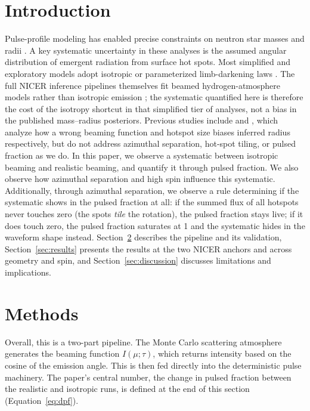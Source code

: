 \documentclass[twocolumn]{aastex701}
\begin{document}


\section{Introduction} \label{sec:intro}
Pulse-profile modeling has enabled precise constraints on neutron star masses and radii
\citep{Bogdanov2019, Riley2019, Miller2019}.
A key systematic uncertainty in these analyses is the assumed angular distribution of
emergent radiation from surface hot spots. Most simplified and exploratory models adopt
isotropic or parameterized limb-darkening laws
\citep[e.g.][]{AnnalaPoutanen2010,Psaltis2014,Sotani2018}.
The full NICER inference pipelines themselves fit beamed hydrogen-atmosphere models rather
than isotropic emission \citep{Bogdanov2019,Riley2019,Miller2019}; the systematic quantified
here is therefore the cost of the isotropy shortcut in that simplified tier of analyses, not
a bias in the published mass--radius posteriors.
Previous studies include \citet{Zhao2024a, Zhao2024b} and \citet{Baubock2015}, which analyze
how a wrong beaming function and hotspot size biases inferred radius respectively, but do
not address azimuthal separation, hot-spot tiling, or pulsed fraction as we do.
In this paper, we observe a systematic between isotropic beaming and realistic beaming, and
quantify it through pulsed fraction. We also observe how azimuthal separation and high spin
influence this systematic.
Additionally, through azimuthal separation, we observe a rule determining if the systematic
shows in the pulsed fraction at all: if the summed flux of all hotspots never touches zero
(the spots \emph{tile} the rotation), the pulsed fraction stays live; if it does touch zero,
the pulsed fraction saturates at 1 and the systematic hides in the waveform shape instead.
Section~\ref{sec:methods} describes the pipeline and its validation,
Section~\ref{sec:results} presents the results at the two NICER anchors and across geometry
and spin, and Section~\ref{sec:discussion} discusses limitations and implications.

\section{Methods} \label{sec:methods}
Overall, this is a two-part pipeline. The Monte Carlo scattering atmosphere generates the
beaming function $I(\mu;\tau)$, which returns intensity based on the cosine of the emission
angle. This is then fed directly into the deterministic pulse machinery. The paper's central
number, the change in pulsed fraction between the realistic and isotropic runs, is defined
at the end of this section (Equation~\eqref{eq:dpf}).
\end{document}
